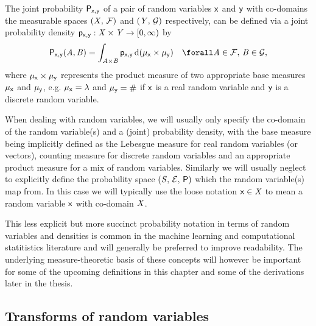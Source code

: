 The joint probability $\mathsf{P}_{\mathsf{x},\mathsf{y}}$ of a pair of random variables $\mathsf{x}$ and $\mathsf{y}$ with co-domains the measurable spaces $(\mathit{X},\,\mathcal{F})$ and $(\mathit{Y},\,\mathcal{G})$ respectively, can be defined via a joint probability density $\mathsf{p}_{\mathsf{x},\mathsf{y}} : \mathit{X} \times \mathit{Y} \to [0,\infty)$ by
\begin{equation}\label{eq:real-rv-joint-prob-dens}
  \prob{\rvar{x},\rvar{y}}(\set{A},\set{B}) =
  \int_{\set{A}\times\set{B}} 
    \pden{\rvar{x},\rvar{y}} 
  \,\dr(\mu_{\rvar{x}} \times \mu_{\rvar{y}})
  \quad \forall \set{A} \in \sset{F}, \,\set{B} \in \sset{G},
\end{equation}
where $\mu_{\mathsf{x}} \times \mu_{\mathsf{y}}$ represents the product measure of two appropriate base measures $\mu_{\mathsf{x}}$ and $\mu_{\mathsf{y}}$, e.g. $\mu_{\rvar{x}} = \lebm{1}$ and $\mu_{\mathsf{y}} = \#$ if $\mathsf{x}$ is a real random variable and $\mathsf{y}$ is a discrete random variable.

When dealing with random variables, we will usually only specify the co-domain of the random variable(s) and a (joint) probability density, with the base measure being implicitly defined as the Lebesgue measure for real random variables (or vectors), counting measure for discrete random variables and an appropriate product measure for a mix of random variables. Similarly we will usually neglect to explicitly define the probability space $(\mathit{S},\,\mathcal{E},\,\mathsf{P})$ which the random variable(s) map from. In this case we will typically use the loose notation $\mathsf{x} \in \mathit{X}$ to mean a random variable $\mathsf{x}$ with co-domain $\mathit{X}$. 

This less explicit but more succinct probability notation in terms of random variables and densities is common in the machine learning and computational statitistics literature and will generally be preferred to improve readability. The underlying measure-theoretic basis of these concepts will however be important for some of the upcoming definitions in this chapter and some of the derivations later in the thesis.

\subsection{Transforms of random variables}\label{subsec:change-of-variables}

